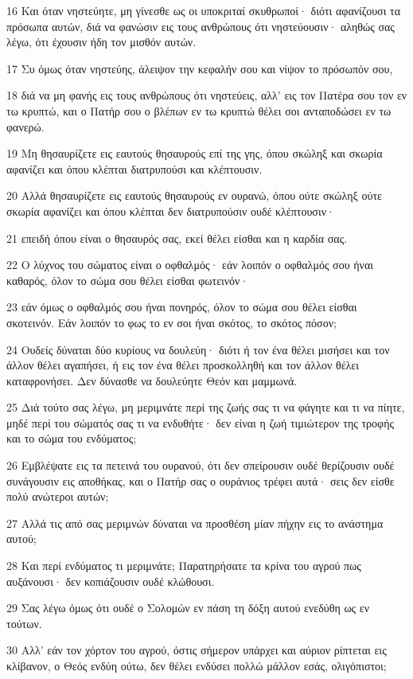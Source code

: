 \par 16 Και όταν νηστεύητε, μη γίνεσθε ως οι υποκριταί σκυθρωποί· διότι αφανίζουσι τα πρόσωπα αυτών, διά να φανώσιν εις τους ανθρώπους ότι νηστεύουσιν· αληθώς σας λέγω, ότι έχουσιν ήδη τον μισθόν αυτών.
\par 17 Συ όμως όταν νηστεύης, άλειψον την κεφαλήν σου και νίψον το πρόσωπόν σου,
\par 18 διά να μη φανής εις τους ανθρώπους ότι νηστεύεις, αλλ' εις τον Πατέρα σου τον εν τω κρυπτώ, και ο Πατήρ σου ο βλέπων εν τω κρυπτώ θέλει σοι ανταποδώσει εν τω φανερώ.
\par 19 Μη θησαυρίζετε εις εαυτούς θησαυρούς επί της γης, όπου σκώληξ και σκωρία αφανίζει και όπου κλέπται διατρυπούσι και κλέπτουσιν.
\par 20 Αλλά θησαυρίζετε εις εαυτούς θησαυρούς εν ουρανώ, όπου ούτε σκώληξ ούτε σκωρία αφανίζει και όπου κλέπται δεν διατρυπούσιν ουδέ κλέπτουσιν·
\par 21 επειδή όπου είναι ο θησαυρός σας, εκεί θέλει είσθαι και η καρδία σας.
\par 22 Ο λύχνος του σώματος είναι ο οφθαλμός· εάν λοιπόν ο οφθαλμός σου ήναι καθαρός, όλον το σώμα σου θέλει είσθαι φωτεινόν·
\par 23 εάν όμως ο οφθαλμός σου ήναι πονηρός, όλον το σώμα σου θέλει είσθαι σκοτεινόν. Εάν λοιπόν το φως το εν σοι ήναι σκότος, το σκότος πόσον;
\par 24 Ουδείς δύναται δύο κυρίους να δουλεύη· διότι ή τον ένα θέλει μισήσει και τον άλλον θέλει αγαπήσει, ή εις τον ένα θέλει προσκολληθή και τον άλλον θέλει καταφρονήσει. Δεν δύνασθε να δουλεύητε Θεόν και μαμμωνά.
\par 25 Διά τούτο σας λέγω, μη μεριμνάτε περί της ζωής σας τι να φάγητε και τι να πίητε, μηδέ περί του σώματός σας τι να ενδυθήτε· δεν είναι η ζωή τιμιώτερον της τροφής και το σώμα του ενδύματος;
\par 26 Εμβλέψατε εις τα πετεινά του ουρανού, ότι δεν σπείρουσιν ουδέ θερίζουσιν ουδέ συνάγουσιν εις αποθήκας, και ο Πατήρ σας ο ουράνιος τρέφει αυτά· σεις δεν είσθε πολύ ανώτεροι αυτών;
\par 27 Αλλά τις από σας μεριμνών δύναται να προσθέση μίαν πήχην εις το ανάστημα αυτού;
\par 28 Και περί ενδύματος τι μεριμνάτε; Παρατηρήσατε τα κρίνα του αγρού πως αυξάνουσι· δεν κοπιάζουσιν ουδέ κλώθουσι.
\par 29 Σας λέγω όμως ότι ουδέ ο Σολομών εν πάση τη δόξη αυτού ενεδύθη ως εν τούτων.
\par 30 Αλλ' εάν τον χόρτον του αγρού, όστις σήμερον υπάρχει και αύριον ρίπτεται εις κλίβανον, ο Θεός ενδύη ούτω, δεν θέλει ενδύσει πολλώ μάλλον εσάς, ολιγόπιστοι;
